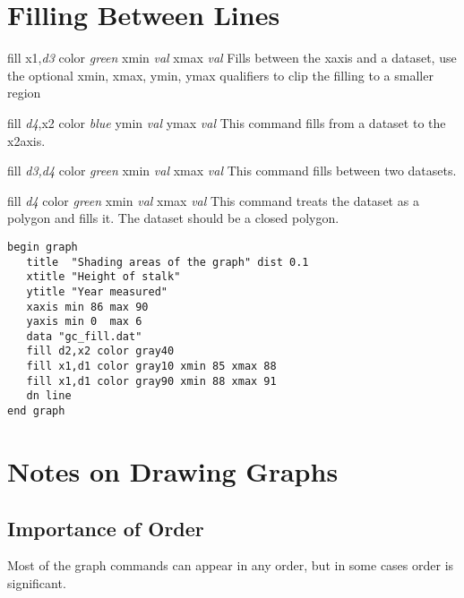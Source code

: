 
\section{Filling Between Lines}
\begin{commanddescription}
  
 
\item[{\sf fill x1,{\it d3} color {\it green}  xmin {\it val} xmax {\it val}} ]
Fills between the xaxis and a dataset, use the optional
{\sf xmin, xmax, ymin, ymax} qualifiers to clip the filling
to a smaller region

\item[{\sf fill {\it d4},x2 color {\it blue}   ymin {\it val} ymax {\it val}} ]
This command fills from a dataset to the x2axis.

\item[{\sf fill {\it d3,d4} color {\it green}  xmin {\it val} xmax {\it val}} ]
This command fills between two datasets.

\item[{\sf fill {\it d4} color {\it green}  xmin {\it val} xmax {\it val}} ]
This command treats the dataset as a polygon and fills it. The dataset
should be a closed polygon.

\begin{minipage}[c]{8cm}
\begin{Verbatim}
begin graph
   title  "Shading areas of the graph" dist 0.1
   xtitle "Height of stalk"
   ytitle "Year measured"
   xaxis min 86 max 90
   yaxis min 0  max 6
   data "gc_fill.dat"
   fill d2,x2 color gray40 
   fill x1,d1 color gray10 xmin 85 xmax 88
   fill x1,d1 color gray90 xmin 88 xmax 91
   dn line
end graph
\end{Verbatim}
\end{minipage}
\hfill
\begin{minipage}[c]{7cm}
\mbox{}
\end{minipage}

\end{commanddescription}

\section{Notes on Drawing Graphs}

\subsection{Importance of Order}
Most of the graph commands can appear in any order, but in some
cases order is significant.

